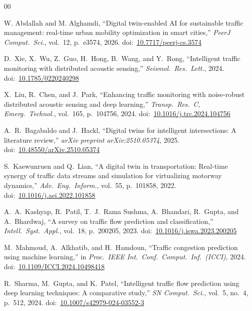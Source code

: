 \documentclass[conference,onecolumn,12pt]{IEEEtran}
\begin{document}
\begin{thebibliography}{00}

W. Abdallah and M. Alghamdi,
``Digital twin-enabled AI for sustainable traffic management: real-time urban
mobility optimization in smart cities,''
\emph{PeerJ Comput.\ Sci.}, vol.~12, p.~e3574, 2026.
doi:~\href{https://doi.org/10.7717/peerj-cs.3574}{10.7717/peerj-cs.3574}

D.~Xie, X.~Wu, Z.~Guo, H.~Hong, B.~Wang, and Y.~Rong,
``Intelligent traffic monitoring with distributed acoustic sensing,''
\emph{Seismol.\ Res.\ Lett.}, 2024.
doi:~\href{https://doi.org/10.1785/0220240298}{10.1785/0220240298}

X.~Liu, R.~Chen, and J.~Park,
``Enhancing traffic monitoring with noise-robust distributed acoustic sensing
and deep learning,''
\emph{Transp.\ Res.\ C, Emerg.\ Technol.}, vol.~165, p.~104756, 2024.
doi:~\href{https://doi.org/10.1016/j.trc.2024.104756}{10.1016/j.trc.2024.104756}

A.~R.~Bagabaldo and J.~Hackl,
``Digital twins for intelligent intersections: A literature review,''
\emph{arXiv preprint arXiv:2510.05374}, 2025.
doi:~\href{https://doi.org/10.48550/arXiv.2510.05374}{10.48550/arXiv.2510.05374}

S.~Kaewunruen and Q.~Lian,
``A digital twin in transportation: Real-time synergy of traffic data streams
and simulation for virtualizing motorway dynamics,''
\emph{Adv.\ Eng.\ Inform.}, vol.~55, p.~101858, 2022.
doi:~\href{https://doi.org/10.1016/j.aei.2022.101858}{10.1016/j.aei.2022.101858}

A.~A.~Kashyap, R.~Patil, T.~J.~Rama Sushma, A.~Bhandari, R.~Gupta, and
A.~Bhardwaj,
``A survey on traffic flow prediction and classification,''
\emph{Intell.\ Syst.\ Appl.}, vol.~18, p.~200205, 2023.
doi:~\href{https://doi.org/10.1016/j.iswa.2023.200205}{10.1016/j.iswa.2023.200205}

M.~Mahmoud, A.~Alkhatib, and H.~Hamdoun,
``Traffic congestion prediction using machine learning,''
in \emph{Proc.\ IEEE Int.\ Conf.\ Comput.\ Inf.\ (ICCI)}, 2024.
doi:~\href{https://doi.org/10.1109/ICCI.2024.10498418}{10.1109/ICCI.2024.10498418}

R.~Sharma, M.~Gupta, and K.~Patel,
``Intelligent traffic flow prediction using deep learning techniques:
A comparative study,''
\emph{SN Comput.\ Sci.}, vol.~5, no.~4, p.~512, 2024.
doi:~\href{https://doi.org/10.1007/s42979-024-03552-3}{10.1007/s42979-024-03552-3}


\end{thebibliography}
\end{document}
